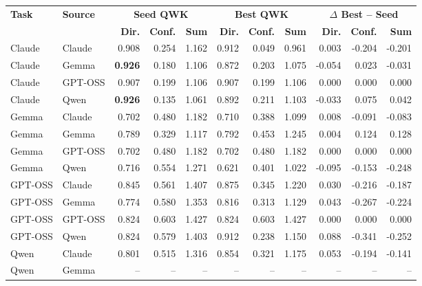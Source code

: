 \documentclass[sigconf,screen]{acmart}
\renewcommand{\arraystretch}{1.05}
\begin{document}
\begin{table}[t]
    \centering
    \tiny
    \setlength{\tabcolsep}{2pt}
    \renewcommand{\arraystretch}{1.05}
    \begin{tabular}{llrrrrrrrrr}
        \hline
        \textbf{Task} & \textbf{Source} &
        \multicolumn{3}{c}{\textbf{Seed QWK}} &
        \multicolumn{3}{c}{\textbf{Best QWK}} &
        \multicolumn{3}{c}{\textbf{$\Delta$ Best -- Seed}} \\
        \cline{3-5}\cline{6-8}\cline{9-11}
        & & \textbf{Dir.} & \textbf{Conf.} & \textbf{Sum} &
        \textbf{Dir.} & \textbf{Conf.} & \textbf{Sum} &
        \textbf{Dir.} & \textbf{Conf.} & \textbf{Sum} \\
        \hline
        Claude & Claude & 0.908 & 0.254 & 1.162 & 0.912 & 0.049 & 0.961 & 0.003 & -0.204 & -0.201 \\
        Claude & Gemma & \textbf{0.926} & 0.180 & 1.106 & 0.872 & 0.203 & 1.075 & -0.054 & 0.023 & -0.031 \\
        Claude & GPT-OSS & 0.907 & 0.199 & 1.106 & 0.907 & 0.199 & 1.106 & 0.000 & 0.000 & 0.000 \\
        Claude & Qwen & \textbf{0.926} & 0.135 & 1.061 & 0.892 & 0.211 & 1.103 & -0.033 & 0.075 & 0.042 \\
        Gemma & Claude & 0.702 & 0.480 & 1.182 & 0.710 & 0.388 & 1.099 & 0.008 & -0.091 & -0.083 \\
        Gemma & Gemma & 0.789 & 0.329 & 1.117 & 0.792 & 0.453 & 1.245 & 0.004 & 0.124 & 0.128 \\
        Gemma & GPT-OSS & 0.702 & 0.480 & 1.182 & 0.702 & 0.480 & 1.182 & 0.000 & 0.000 & 0.000 \\
        Gemma & Qwen & 0.716 & 0.554 & 1.271 & 0.621 & 0.401 & 1.022 & -0.095 & -0.153 & -0.248 \\
        GPT-OSS & Claude & 0.845 & 0.561 & 1.407 & 0.875 & 0.345 & 1.220 & 0.030 & -0.216 & -0.187 \\
        GPT-OSS & Gemma & 0.774 & 0.580 & 1.353 & 0.816 & 0.313 & 1.129 & 0.043 & -0.267 & -0.224 \\
        GPT-OSS & GPT-OSS & 0.824 & 0.603 & 1.427 & 0.824 & 0.603 & 1.427 & 0.000 & 0.000 & 0.000 \\
        GPT-OSS & Qwen & 0.824 & 0.579 & 1.403 & 0.912 & 0.238 & 1.150 & 0.088 & -0.341 & -0.252 \\
        Qwen & Claude & 0.801 & 0.515 & 1.316 & 0.854 & 0.321 & 1.175 & 0.053 & -0.194 & -0.141 \\
        Qwen & Gemma & -- & -- & -- & -- & -- & -- & -- & -- & -- \\

\end{tabular}
\end{table}
\end{document}

